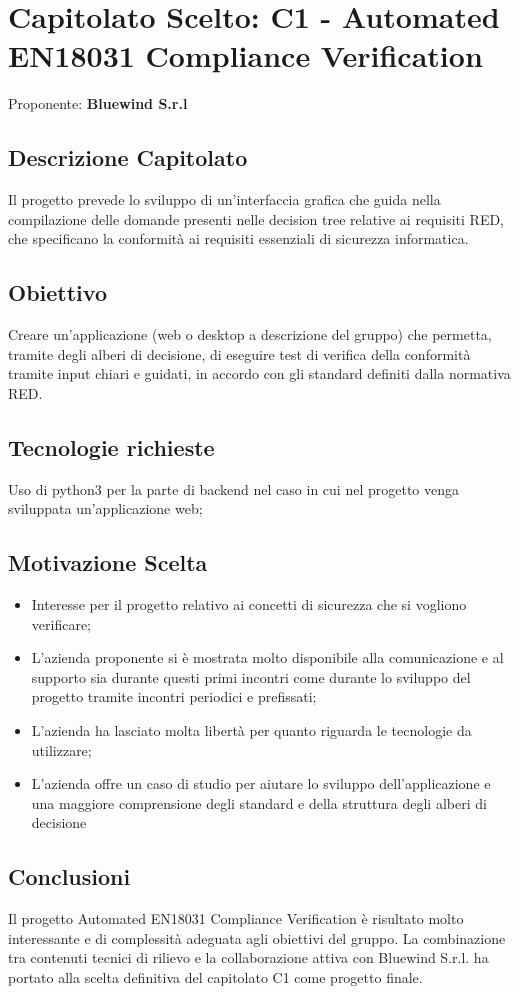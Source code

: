 \documentclass[a4paper,12pt]{article}
\begin{document}
\newpage

\section{Capitolato Scelto: C1 - Automated EN18031 Compliance Verification}{
    Proponente: \textbf{Bluewind S.r.l}
    \subsection*{Descrizione Capitolato}{
        Il progetto prevede lo sviluppo di un'interfaccia grafica che guida nella compilazione delle domande presenti nelle decision tree relative ai requisiti RED, che specificano la conformità ai requisiti essenziali di sicurezza informatica.
    }

    \subsection*{Obiettivo}{
        Creare un'applicazione (web o desktop a descrizione del gruppo) che permetta, tramite degli alberi di decisione, di eseguire test di verifica della conformità tramite input chiari e guidati, in accordo con gli standard definiti dalla normativa RED.
    }

    \subsection*{Tecnologie richieste}{
        Uso di python3 per la parte di backend nel caso in cui nel progetto venga sviluppata un'applicazione web;
    }

    \subsection*{Motivazione Scelta}{
        \begin{itemize}
            \item Interesse per il progetto relativo ai concetti di sicurezza che si vogliono verificare;
            \item L'azienda proponente si è mostrata molto disponibile alla comunicazione e al supporto sia durante questi primi incontri come durante lo sviluppo del progetto tramite incontri periodici e prefissati;
            \item L'azienda ha lasciato molta libertà per quanto riguarda le tecnologie da utilizzare;
            \item L'azienda offre un caso di studio per aiutare lo sviluppo dell'applicazione e una maggiore comprensione degli standard e della struttura degli alberi di decisione
        \end{itemize}
    }

    \subsection*{Conclusioni}{
        Il progetto Automated EN18031 Compliance Verification è risultato molto interessante e di complessità adeguata agli obiettivi del gruppo. La combinazione tra contenuti tecnici di rilievo e la collaborazione attiva con Bluewind S.r.l. ha portato alla scelta definitiva del capitolato C1 come progetto finale.
    }
}
\end{document}
